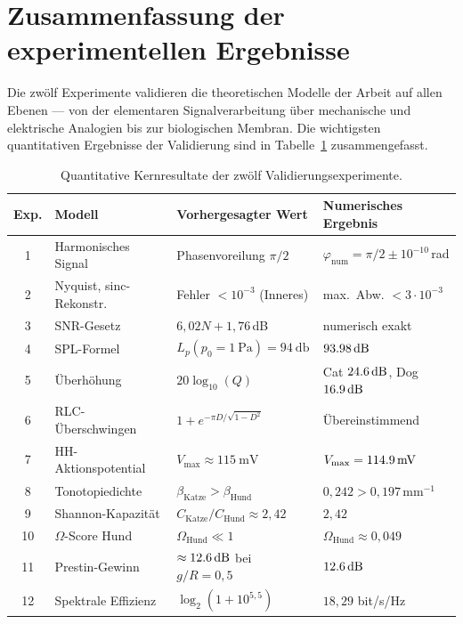 ﻿\documentclass[12pt,a4paper,titlepage]{report}
\begin{document}
\section{Zusammenfassung der experimentellen Ergebnisse}

Die zwölf Experimente validieren die theoretischen Modelle der Arbeit
auf allen Ebenen --- von der elementaren Signalverarbeitung über
mechanische und elektrische Analogien bis zur biologischen Membran.
Die wichtigsten quantitativen Ergebnisse der Validierung sind in
Tabelle~\ref{tab:exp_summary} zusammengefasst.

\begin{table}[H]
\centering
\caption{Quantitative Kernresultate der zwölf Validierungsexperimente.}
\label{tab:exp_summary}
\begin{tabular}{clll}
\toprule
\textbf{Exp.} & \textbf{Modell} & \textbf{Vorhergesagter Wert} & \textbf{Numerisches Ergebnis} \\
\midrule
1 & Harmonisches Signal &
  Phasenvoreilung $\pi/2$ &
  $\varphi_{\mathrm{num}} = \pi/2 \pm 10^{-10}$\,rad \\
2 & Nyquist, sinc-Rekonstr. &
  Fehler $< 10^{-3}$ (Inneres) &
  max.\ Abw. $< 3\cdot10^{-3}$ \\
3 & SNR-Gesetz &
  $6{,}02N+1{,}76$\,dB &
  numerisch exakt \\
4 & SPL-Formel &
  $L_p(p_0=\SI{1}{\pascal})=\SI{94}{\decibel}$ &
  $\SI{93{,}98}{\decibel}$ \\
5 & Überhöhung &
  $20\log_{10}(Q)$ &
  Cat $\SI{24{,}6}{\decibel}$, Dog $\SI{16{,}9}{\decibel}$ \\
6 & RLC-Überschwingen &
  $1+e^{-\pi D/\sqrt{1-D^2}}$ &
  Übereinstimmend \\
7 & HH-Aktionspotential &
  $V_{\max}\approx\SI{115}{\milli\volt}$ &
  $V_{\max}=\SI{114{,}9}{\milli\volt}$ \\
8 & Tonotopiedichte &
  $\beta_{\mathrm{Katze}}>\beta_{\mathrm{Hund}}$ &
  $0{,}242>0{,}197\,\mathrm{mm}^{-1}$ \\
9 & Shannon-Kapazität &
  $C_{\mathrm{Katze}}/C_{\mathrm{Hund}}\approx2{,}42$ &
  $2{,}42$ \\
10 & $\Omega$-Score Hund &
  $\Omega_{\mathrm{Hund}}\ll1$ &
  $\Omega_{\mathrm{Hund}}\approx0{,}049$ \\
11 & Prestin-Gewinn &
  $\approx\SI{12{,}6}{\decibel}$ bei $g/R=0{,}5$ &
  $\SI{12{,}6}{\decibel}$ \\
12 & Spektrale Effizienz &
  $\log_2(1+10^{5{,}5})$ &
  $18{,}29$ bit/s/Hz \\
\bottomrule
\end{tabular}
\end{table}
\end{document}
